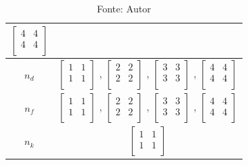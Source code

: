 \begin{table}[h]
\begin{tabular}{c|c}
							$ \begin{bmatrix}	4	&	4	\\	4	&	4	\\	\end{bmatrix} $		\\ \midrule
		$n_d$			&
							$ \begin{bmatrix}	1	&	1	\\	1	&	1	\\	\end{bmatrix} $	,		
							$ \begin{bmatrix}	2	&	2	\\	2	&	2	\\	\end{bmatrix} $	,		
							$ \begin{bmatrix}	3	&	3	\\	3	&	3	\\	\end{bmatrix} $	,		
							$ \begin{bmatrix}	4	&	4	\\	4	&	4	\\	\end{bmatrix} $		\\ \midrule
		$n_f$			&
							$ \begin{bmatrix}	1	&	1	\\	1	&	1	\\	\end{bmatrix} $	,		
							$ \begin{bmatrix}	2	&	2	\\	2	&	2	\\	\end{bmatrix} $	,		
							$ \begin{bmatrix}	3	&	3	\\	3	&	3	\\	\end{bmatrix} $	,		
							$ \begin{bmatrix}	4	&	4	\\	4	&	4	\\	\end{bmatrix} $		\\ \midrule
		$n_k$			&
							$ \begin{bmatrix}	1	&	1	\\	1	&	1	\\	\end{bmatrix} $		\\ \bottomrule
	\end{tabular}
	\caption*{Fonte: Autor}
\end{table}

